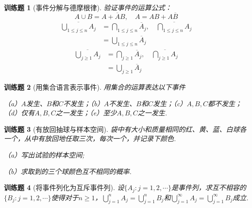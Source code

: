 \documentclass[UTF8,12pt,a4paper,fontset=fandol]{ctexbook}
\newtheorem{exercise}{训练题}[section]
\begin{document}
\begin{exercise}[事件分解与德摩根律]\label{q:Y1.1}
验证事件的运算公式：
\[
A\cup B=A+\overline{A}B,\quad A=AB+A\overline{B}
\]
\[\begin{aligned}\overline {\bigcup\limits_{1 \leqslant j \leqslant n} {{A_j}} }  &= \bigcap\limits_{1 \leqslant j \leqslant n} {{{\overline A }_j}},\quad  \overline {\bigcap\limits_{1 \leqslant j \leqslant n} {{A_j}} }  \\&= \bigcup\limits_{1 \leqslant j \leqslant n} {{{\overline A }_j}} \end{aligned}\]
\[\begin{aligned}\overline {\bigcup\limits_{j \geqslant 1} {{A_j}} }  &= \bigcap\limits_{j \geqslant 1} {{{\overline A }_j}},\quad  \overline {\bigcap\limits_{j \geqslant 1} {{A_j}} }  \\&= \bigcup\limits_{j \geqslant 1} {{{\overline A }_j}} \end{aligned}\]\par{}\end{exercise}

\begin{exercise}[用集合语言表示事件]\label{q:Y1.2}
用集合的运算表达以下事件

（a）$A$发生、$B$和$C$不发生；（b）$A$不发生、$B$和$C$发生；（c）$A,B,C$都不发生；（d）仅有$A,B,C$之一发生；（e）至少$A,B,C$之一发生.\par{}\end{exercise}

\begin{exercise}[有放回抽球与样本空间]\label{q:Y1.3}
袋中有大小和质量相同的红、黄、蓝、白球各一个，从中有放回地任取三次，每次一个，并记录下颜色.

（a）写出试验的样本空间;

（b）求取到的三个球颜色互不相同的概率.\par{}\end{exercise}

\begin{exercise}[将事件列化为互斥事件列]\label{q:Y1.4}
设$\{A_j:j=1,2,\cdots\}$是事件列，求互不相容的$\{B_j:j=1,2,\cdots\}$使得对于$n\geqslant 1$，$\bigcup\limits_{j = 1}^n {{A_j}}  = \bigcup\limits_{j = 1}^n {{B_j}} $和$\bigcup\limits_{j = 1}^\infty  {{A_j}}  = \bigcup\limits_{j = 1}^\infty  {{B_j}} $成立.\par{}\end{exercise}
\end{document}
